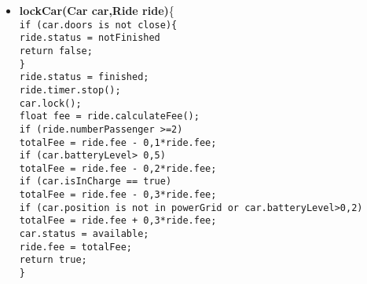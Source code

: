 \begin{itemize}
\item \textbf{lockCar(Car car,Ride ride)}\{\\
\texttt{if (car.doors is not close)\{\\
\tab ride.status = notFinished\\
\tab return false;\\
\tab \}\\
ride.status = finished;\\
ride.timer.stop();\\
car.lock();\\
float fee = ride.calculateFee();\\
if (ride.numberPassenger >=2)\\
\tab totalFee = ride.fee - 0,1*ride.fee;\\
if (car.batteryLevel> 0,5)\\
\tab totalFee = ride.fee - 0,2*ride.fee;\\
if (car.isInCharge == true)\\
\tab totalFee = ride.fee - 0,3*ride.fee;\\
if (car.position is not in powerGrid or car.batteryLevel>0,2)\\
\tab totalFee = ride.fee + 0,3*ride.fee;\\
car.status = available;\\
ride.fee = totalFee;\\
return true;\\
\}\\
}
\end{itemize}





